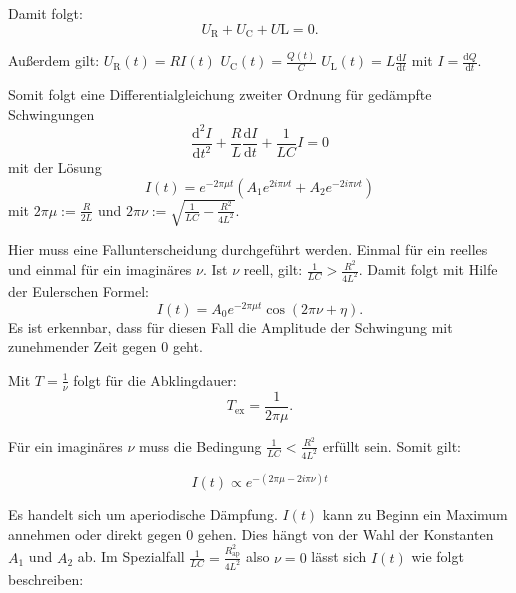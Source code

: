 Damit folgt:
\begin{equation}
  U_{\mathrm R} + U_{\mathrm C} + U{\mathrm L} = 0.
\end{equation}

Außerdem gilt:
$U_{\mathrm R}(t) = R I(t)$
$U_{\mathrm C}(t) = \frac{Q(t)}{C}$
$U_{\mathrm L}(t) = L \frac{\mathrm{d}I}{\mathrm{d}t}$ mit $I = \frac{\mathrm{d}Q}{\mathrm{d}t}$.

Somit folgt eine Differentialgleichung zweiter Ordnung für gedämpfte Schwingungen
\begin{equation}
  \label{eqn:dgl}
  \frac{\mathrm{d}^2 I}{\mathrm{d}t^2} + \frac{R}{L} \frac{\mathrm{d}I}{\mathrm{d}t} + \frac{1}{LC} I = 0
\end{equation}
 mit der Lösung
 \begin{equation}
   I(t) = e^{-2\pi \mu t}(A_{1} e^{2i\pi \nu t} + A_{2} e^{-2i\pi \nu t})
\end{equation}
mit $2\pi \mu := \frac{R}{2L}$ und $2\pi \nu := \sqrt{\frac{1}{LC} - \frac{R^2}{4L^2}}$.

Hier muss eine Fallunterscheidung durchgeführt werden. Einmal für ein reelles und einmal für ein imaginäres $\nu$.
Ist $\nu$ reell, gilt: $\frac{1}{LC} > \frac{R^2}{4L^2}$. Damit folgt mit Hilfe der Eulerschen Formel:
\begin{equation}
  \label{eqn:jfjfjfjf}
  I(t) = A_0 e^{-2\pi \mu t} \cos(2\pi\nu + \eta).
\end{equation}
Es ist erkennbar, dass für diesen Fall die Amplitude der Schwingung mit zunehmender Zeit gegen 0 geht.

Mit $T = \frac{1}{\nu}$ folgt für die Abklingdauer:
\begin{equation}
  T_{\mathrm{ex}} = \frac{1}{2\pi\mu}.
\end{equation}


Für ein imaginäres $\nu$ muss die Bedingung $\frac{1}{LC} < \frac{R^2}{4L^2}$ erfüllt sein.
Somit gilt:

\begin{equation}
  I(t) \propto e^{-(2\pi\mu -2i\pi\nu)t}
\end{equation}

Es handelt sich um aperiodische Dämpfung. $I(t)$ kann zu Beginn ein Maximum annehmen oder direkt gegen 0 gehen. Dies hängt von der Wahl der Konstanten $A_{1}$ und $A_{2}$ ab.
Im Spezialfall $\frac{1}{LC} = \frac{R_{\mathrm{ap}}^2}{4L^2}$ also $\nu = 0$
lässt sich $I(t)$ wie folgt beschreiben:

